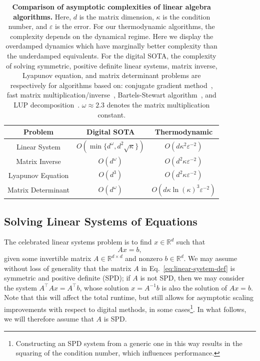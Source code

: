 \documentclass[prx,onecolumn,floatfix,longbibliography,notitlepage, nofootinbib]{revtex4-1}
\begin{document}
\begin{table}[t]
    \centering
    \renewcommand{\arraystretch}{2}
    \begin{tabular}{c|c|c}
        \textbf{Problem} & \textbf{Digital SOTA}  
        & \textbf{Thermodynamic}  \\
        \hline
        Linear System &$O(\min\{d^\omega,d^2 \sqrt{\kappa}\})$ & $O( d \kappa^2\varepsilon^{-2})$\\
        Matrix Inverse &  $O(d^\omega)$  & $O( d^2 \kappa \varepsilon^{-2})$\\
        Lyapunov Equation &$O(d^3)$ &   $O( d^2 \kappa \varepsilon^{-2})$ \\
        Matrix Determinant & $O(d^\omega)$ &   $O(d \kappa  \ln(\kappa)^3 \varepsilon^{-2})$\\
    \end{tabular}
    \caption{\textbf{Comparison of asymptotic complexities of linear algebra algorithms.} Here, $d$ is the matrix dimension, $\kappa$ is the condition number, and $\varepsilon$ is the error. For our thermodynamic algorithms, the complexity depends on the dynamical regime. Here we display the overdamped dynamics which have marginally better complexity than the underdamped equivalents. For the digital SOTA, the complexity of solving symmetric, positive definite linear systems, matrix inverse, Lyapunov equation, and matrix determinant problems are respectively for algorithms based on: conjugate gradient method~\cite{shewchuk1994introduction}, fast matrix multiplication/inverse~\cite{robinson2005toward}, Bartels-Stewart algorithm~\cite{bartels1972solution}, and LUP decomposition~\cite{aho1974design}. $\omega\approx 2.3$ denotes the matrix multiplication constant.}
    \label{tab:runtime_scaling}
\end{table}






\subsection{Solving Linear Systems of Equations}\label{sec:linear_sys}




The celebrated linear systems problem is to find $x \in \mathbb{R}^d$ such that
\begin{equation}
\label{eq:linear-system-def}
    A x = b,
\end{equation}
given some invertible matrix $A \in \mathbb{R}^{d \times d}$ and nonzero $b \in \mathbb{R}^d$. We may assume without loss of generality that the matrix $A$ in Eq.~\eqref{eq:linear-system-def} is symmetric and positive definite (SPD); if $A$ is not SPD, then we may consider the system $A^\intercal A x = A^\intercal b$, whose solution $x=A^{-1} b$ is also the solution of $A x = b$. Note that this will affect the total runtime, but still allows for asymptotic scaling improvements with respect to digital methods, in some cases\footnote{Constructing an SPD system from a generic one in this way results in the squaring of the condition number, which influences performance.}. In what follows, we will therefore assume that $A$ is SPD.
\end{document}
